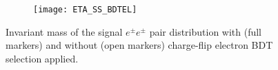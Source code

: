 \begin{figure}[htb!]
\centering
\begin{subfigure}[t]{0.66\textwidth}\texttt{[image: ETA\_SS\_BDTEL]}\end{subfigure}
\caption{Invariant mass of the signal $e^{\pm} e^{\pm}$ pair distribution with (full markers) and without (open markers) charge-flip electron BDT selection applied.
}
\label{fig:ETA_SS_BDTEL}
\end{figure}
